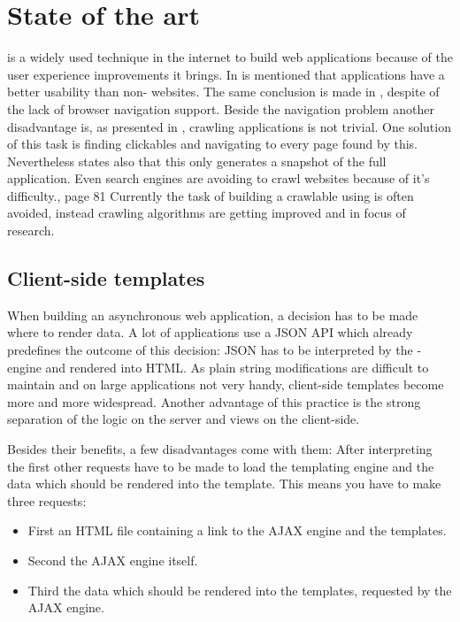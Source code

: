 \section{State of the art}
\ajax{} is a widely used technique in the internet to build web applications because of the user experience improvements it brings.
In \cite{roodt06} is mentioned that \ajax{} applications have a better usability than non-\ajax{} websites.
The same conclusion is made in \cite{klugeKarglWeber07}, despite of the lack of browser navigation support.
Beside the navigation problem another disadvantage is, as presented in \cite{mesbah09}, crawling \ajax{} applications is not trivial.
One solution of this task is finding clickables and navigating to every page found by this.
Nevertheless \cite{mesbah09} states also that this only generates a snapshot of the full application.
Even search engines are avoiding to crawl websites because of it's difficulty.\cite{matter08}, page 81
Currently the task of building a crawlable \singlePageApplication{} using \ajax{} is often avoided, instead crawling algorithms are getting improved and in focus of research.

\subsection{Client-side templates\label{clientSideTemplates}}
When building an asynchronous web application, a decision has to be made where to render data.
A lot of \ajax{} applications use a JSON API which already predefines the outcome of this decision:
JSON has to be interpreted by the \ajax{}-engine and rendered into HTML.
As plain string modifications are difficult to maintain and on large applications not very handy, client-side templates become more and more widespread.
Another advantage of this practice is the strong separation of the logic on the server and views on the client-side.

Besides their benefits, a few disadvantages come with them:
After interpreting the first \httpRequest{} other requests have to be made to load the templating engine and the data which should be rendered into the template.
This means you have to make three requests:
\begin{itemize}
    \item First an HTML file containing a link to the AJAX engine and the templates.
    \item Second the AJAX engine itself.
    \item Third the data which should be rendered into the templates, requested by the AJAX engine.
\end{itemize}

